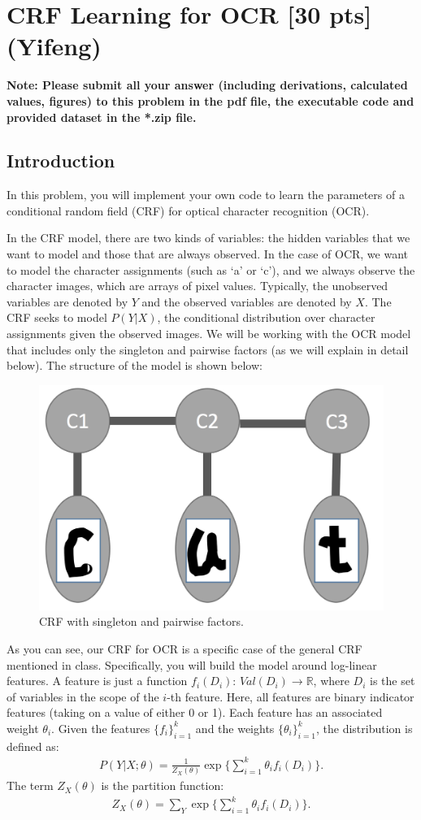 
\section{CRF Learning for OCR [30 pts] (Yifeng)}

\textbf{Note: Please submit all your answer (including derivations, calculated values, figures) to this problem in the pdf file, the executable code and provided dataset in the *.zip file.}

\subsection{Introduction}
In this problem, you will implement your own code to learn the parameters of a conditional random field (CRF) for optical character recognition (OCR).

In the CRF model, there are two kinds of variables: the hidden variables that we want to model and those that are always observed. In the case of OCR, we want to model the character assignments (such as ‘a’ or ‘c’), and we always observe the character images, which are arrays of pixel values. Typically, the unobserved variables are denoted by $Y$ and the observed variables are denoted by $X$. The CRF seeks to model $P(Y |X)$, the conditional distribution over character assignments given the observed images. We will be working with the OCR model that includes only the singleton and pairwise factors (as we will explain in detail below). The structure of the model is shown below:

\begin{figure}[h]
	\centering
	\includegraphics[width = 0.3\linewidth]{figures/figCRF1.png}
	\caption{CRF with singleton and pairwise factors.}
\label{fig:crf}
\end{figure}

As you can see, our CRF for OCR is a specific case of the general CRF mentioned in class. Specifically, you will build the model around log-linear features. A feature is just a function $f_i (D_i)$: $Val(D_i) \rightarrow \mathbb{R}$, where $D_i$ is the set of variables in the scope of the $i$-th feature. Here, all features are binary indicator features (taking on a value of either 0 or 1). Each feature has an associated weight $\theta_i$. Given the features $\{f_i\}_{i=1}^k$ and the weights $\{ \theta_i  \}_{i = 1}^k$, the distribution is defined as:
\begin{align}
P(Y | X; \theta) = \frac{1}{Z_X (\theta)}  \exp \{  \sum_{i=1}^{k} \theta_i f_i (D_i)  \}.
\end{align}
The term $Z_X (\theta)$ is the partition function:
\begin{align}
Z_X (\theta) = \sum_Y \exp \{ \sum_{i=1}^k \theta_i f_i ( D_i )  \}.
\end{align}

